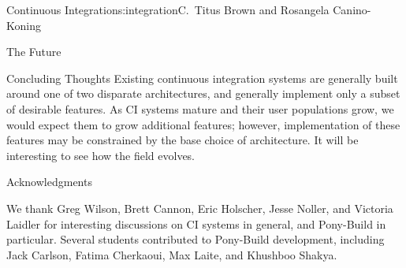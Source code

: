 \begin{aosachapter}{Continuous Integration}{s:integration}{C.\ Titus Brown and Rosangela Canino-Koning}
\begin{aosasect1}{The Future}
\begin{aosasect2}{Concluding Thoughts}
Existing continuous integration systems are generally built around one
of two disparate architectures, and generally implement only a subset
of desirable features.  As CI systems mature and their user
populations grow, we would expect them to grow additional features;
however, implementation of these features may be constrained by the
base choice of architecture.  It will be interesting to see how the
field evolves.

\end{aosasect2}

\begin{aosasect2}{Acknowledgments}

We thank Greg Wilson, Brett Cannon, Eric Holscher, Jesse Noller, and
Victoria Laidler for interesting discussions on CI systems in general,
and Pony-Build in particular.  Several students contributed to
Pony-Build development, including Jack Carlson, Fatima Cherkaoui, Max
Laite, and Khushboo Shakya.

\end{aosasect2}

\end{aosasect1}

\end{aosachapter}
